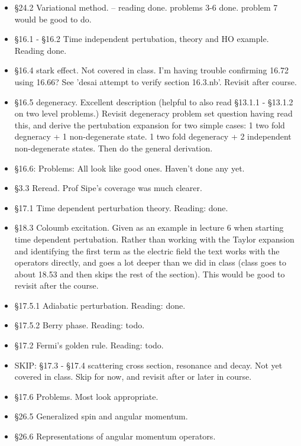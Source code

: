 \documentclass[12pt,leqno]{book}
\begin{document}
\begin{itemize}
\item \S 24.2 Variational method.  -- reading done.  problems 3-6 done.  problem 7 would be good to do.
\item \S 16.1 - \S 16.2 Time independent pertubation, theory and HO example.  Reading done.
\item \S 16.4 stark effect.  Not covered in class.  I'm having trouble confirming 16.72 using 16.66?  See 'desai attempt to verify section 16.3.nb'.  Revisit after course.
\item \S 16.5 degeneracy.  Excellent description (helpful to also read \S 13.1.1 - \S 13.1.2 on two level problems.)  Revisit degeneracy problem set question having read this, and derive the pertubation expansion for two simple cases: 1 two fold degneracy + 1 non-degenerate state.  1 two fold degeneracy + 2 independent non-degenerate states.  Then do the general derivation.
\item \S 16.6: Problems: All look like good ones.  Haven't done any yet.
\item \S 3.3 Reread.  Prof Sipe's coverage was much clearer.

\item \S 17.1 Time dependent perturbation theory.  Reading: done.
\item \S 18.3 Coloumb excitation.  Given as an example in lecture 6 when starting time dependent pertubation.  Rather than working with the Taylor expansion and identifying the first term as the electric field the text works with the operators directly, and goes a lot deeper than we did in class (class goes to about 18.53 and then skips the rest of the section).  This would be good to revisit after the course.
\item \S 17.5.1 Adiabatic perturbation.  Reading: done.
\item \S 17.5.2 Berry phase. Reading: todo.
\item \S 17.2 Fermi's golden rule. Reading: todo.
\item SKIP: \S 17.3 - \S 17.4 scattering cross section, resonance and decay.  Not yet covered in class.  Skip for now, and revisit after or later in course.
\item \S 17.6 Problems.  Most look appropriate.
\item \S 26.5 Generalized spin and angular momentum.
\item \S 26.6 Representations of angular momentum operators.
\end{itemize}
\end{document}
